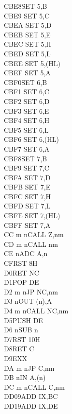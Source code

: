 \begin{multicols}{3}
{\begin{tabbing}
    CBE8\>SET 5,B\\
    CBE9\> 	SET 5,C\\
    CBEA\> 	SET 5,D\\
    CBEB\> 	SET 5,E\\
    CBEC\> 	SET 5,H\\
    CBED\> 	SET 5,L\\
    CBEE\> 	SET 5,(HL)\\
    CBEF\> 	SET 5,A\\
    CBF0\>SET 6,B\\
    CBF1\> 	SET 6,C\\
    CBF2\> 	SET 6,D\\
    CBF3\> 	SET 6,E\\
    CBF4\> 	SET 6,H\\
    CBF5\> 	SET 6,L\\
    CBF6\> 	SET 6,(HL)\\
    CBF7\> 	SET 6,A\\
    CBF8\>SET 7,B\\
    CBF9\> 	SET 7,C\\
    CBFA\> 	SET 7,D\\
    CBFB\> 	SET 7,E\\
    CBFC\> 	SET 7,H\\
    CBFD\> 	SET 7,L\\
    CBFE\> 	SET 7,(HL)\\
    CBFF\> 	SET 7,A\\
    CC m n\>CALL Z,nm\\
    CD m n\>CALL nm\\
    CE n\>ADC A,n\\
    CF\>RST 8H\\
    D0\>RET NC\\
    D1\>POP DE\\
    D2 m n\>JP NC,nm\\
    D3 n\>OUT (n),A\\
    D4 m n\>CALL NC,nm\\
    D5\>PUSH DE\\
    D6 n\>SUB n\\
    D7\>RST 10H\\
    D8\>RET C\\
    D9\>EXX\\
    DA m n\>JP C,nm\\
    DB n\>IN A,(n)\\
    DC m n\>CALL C,nm\\
    DD09\>ADD IX,BC\\
    DD19\>ADD IX,DE\\

\end{tabbing}}
\end{multicols}
